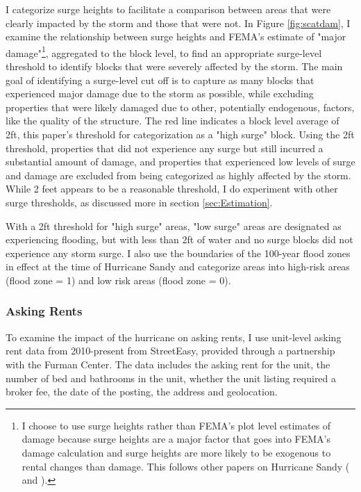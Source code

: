 \documentclass[12pt]{article}
\begin{document}
{{{{I categorize surge heights to facilitate a comparison between areas that were clearly impacted by the storm and those that were not. In Figure \ref{fig:scatdam}, I examine the relationship between surge heights and FEMA's estimate of "major damage"\footnote{I choose to use surge heights rather than FEMA's plot level estimates of damage because surge heights are a major factor that goes into FEMA's damage calculation and surge heights are more likely to be exogenous to rental changes than damage.  This follows other papers on Hurricane Sandy (\cite{ellen_heterogeneity_2022} and \cite{meltzer_localized_2021}).}, aggregated to the block level, to find an appropriate surge-level threshold to identify blocks that were severely affected by the storm.  The main goal of identifying a surge-level cut off is to capture as many blocks that experienced major damage due to the storm as possible, while excluding properties that were likely damaged due to other, potentially endogenous, factors, like the quality of the structure.  The red line indicates a block level average of 2ft, this paper's threshold for categorization as a "high surge" block.   Using the 2ft threshold, properties that did not experience any surge but still incurred a substantial amount of damage, and properties that experienced low levels of surge and damage are excluded from being categorized as highly affected by the storm.  While 2 feet appears to be a reasonable threshold, I do experiment with other surge thresholds, as discussed more in section \ref{sec:Estimation}.   

With a 2ft threshold for "high surge" areas, "low surge" areas are designated as experiencing flooding, but with less than 2ft of water and no surge blocks did not experience any storm surge.  I also use the boundaries of the 100-year flood zones in effect at the time of Hurricane Sandy and categorize areas into high-risk areas (flood zone = 1) and low risk areas (flood zone = 0). 

\subsubsection*{Asking Rents} 
To examine the impact of the hurricane on asking rents, I use unit-level asking rent data from 2010-present from StreetEasy, provided through a partnership with the Furman Center. The data includes the asking rent for the unit, the number of bed and bathrooms in the unit, whether the unit listing required a broker fee, the date of the posting, the address and geolocation. 

}}}}
\end{document}
